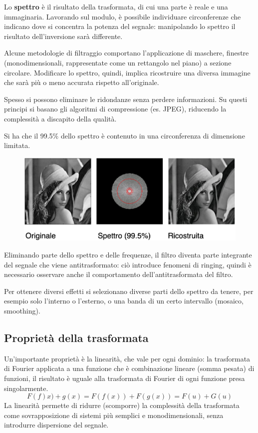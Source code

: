 Lo \textbf{spettro} è il risultato della trasformata, di cui una parte è reale e una immaginaria. Lavorando sul modulo, è possibile individuare circonferenze che indicano dove si concentra la potenza del segnale: manipolando lo spettro il risultato dell'inversione sarà differente. 

Alcune metodologie di filtraggio comportano l'applicazione di maschere, finestre (monodimensionali, rappresentate come un rettangolo nel piano) a sezione circolare. Modificare lo spettro, quindi, implica ricostruire una diversa immagine che sarà più o meno accurata rispetto all'originale. 

Spesso si possono eliminare le ridondanze senza perdere informazioni. Su questi principi si basano gli algoritmi di compressione (es. JPEG), riducendo la complessità a discapito della qualità.

Si ha che il 99.5\% dello spettro è contenuto in una circonferenza di dimensione limitata.
\begin{figure}[h]
	\centering
	\includegraphics[scale=0.45]{Lezioni/Immagini/spettro}
\end{figure}

Eliminando parte dello spettro e delle frequenze, il filtro diventa parte integrante del segnale che viene antitrasformato: ciò introduce fenomeni di ringing, quindi è necessario osservare anche il comportamento dell'antitrasformata del filtro. 

Per ottenere diversi effetti si selezionano diverse parti dello spettro da tenere, per esempio solo l'interno o l'esterno, o una banda di un certo intervallo (mosaico, smoothing). 

\subsection{Proprietà della trasformata}
Un'importante proprietà è la linearità, che vale per ogni dominio: la trasformata di Fourier applicata a una funzione che è combinazione lineare (somma pesata) di funzioni, il risultato è uguale alla trasformata di Fourier di ogni funzione presa singolarmente. 
$$F(f)x) + g(x) = F(f(x)) + F(g(x)) = F(u) + G(u)$$
La linearità permette di ridurre (scomporre) la complessità della trasformata come sovrapposizione di sistemi più semplici e monodimensionali, senza introdurre dispersione del segnale.

